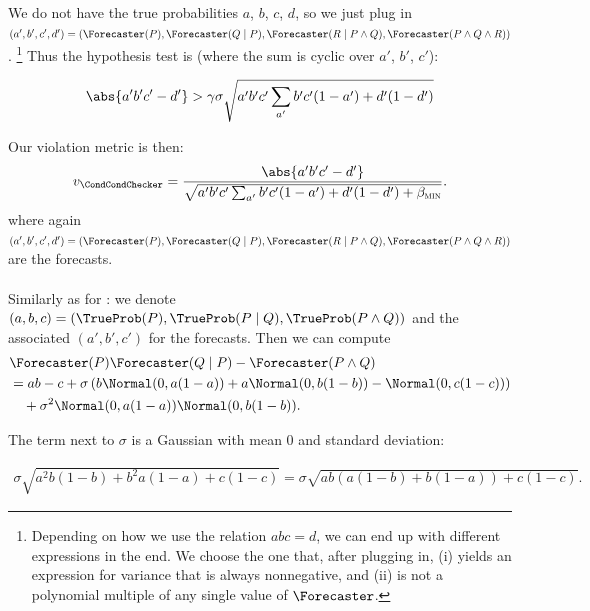 We do not have the true probabilities $a$, $b$, $c$, $d$, so we just plug in $(a', b', c', d') = (\Forecaster(P), \Forecaster(Q \mid P), \Forecaster(R \mid P \wedge Q), \Forecaster(P \wedge Q \wedge R))$. \footnote{Depending on how we use the relation $abc=d$, we can end up with different expressions in the end. We choose the one that, after plugging in, (i) yields an expression for variance that is always nonnegative, and (ii) is not a polynomial multiple of any single value of $\Forecaster$.}
 Thus the hypothesis test is (where the sum is cyclic over $a'$, $b'$, $c'$):

\begin{align*}
    \abs{a'b'c' - d'}
    > \gamma \sigma \sqrt{ a' b' c' \sum_{a'} b'c' (1-a') + d' (1-d')}
\end{align*}

Our violation metric is then:
\begin{align*}
    v_{\CondCondChecker}
    = \frac{
        \abs{a'b'c' - d'}
        }{
        \sqrt{a'b'c' \sum_{a'} b'c' (1-a') + d' (1-d')+ \betamin}
    }.
\end{align*}
where again $(a', b', c', d') = (\Forecaster(P), \Forecaster(Q \mid P), \Forecaster(R \mid P \wedge Q), \Forecaster(P \wedge Q \wedge R))$ are the forecasts.


\paragraph{\CondChecker}

Similarly as for \CondCondChecker: we denote
$(a, b, c) = \left(\TrueProb(P),  \TrueProb(P \mid Q), \TrueProb(P \wedge Q) \right)$ and the associated $(a', b', c')$ for the forecasts.
Then we can compute
\begin{align*}
    &\Forecaster(P) \Forecaster(Q \mid P) - \Forecaster(P \wedge Q) \\
    &= ab - c + \sigma \left(b \Normal(0, a(1-a)) + a \Normal(0, b(1-b)) - \Normal(0, c(1-c)) \right) \\
    &\quad + \sigma^2 \Normal(0, a(1-a)) \Normal(0, b(1-b)).
\end{align*}

The term next to $\sigma$ is a Gaussian with mean 0 and standard deviation:

\begin{align*}
    \sigma \sqrt{a^2 b(1-b) + b^2 a(1-a) + c(1-c)}
    = \sigma \sqrt{ab \left( a(1-b) + b(1-a) \right) + c(1-c)}.
\end{align*}


